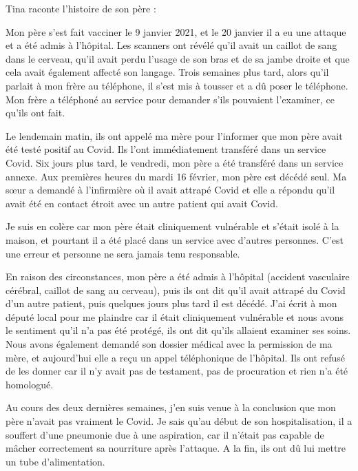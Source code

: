 Tina raconte l'histoire de son père :

Mon père s'est fait vacciner le 9 janvier 2021, et le 20 janvier il a eu une
attaque et a été admis à l'hôpital. Les scanners ont révélé qu'il avait un
caillot de sang dans le cerveau, qu'il avait perdu l'usage de son bras et de sa
jambe droite et que cela avait également affecté son langage. Trois semaines
plus tard, alors qu'il parlait à mon frère au téléphone, il s'est mis à tousser
et a dû poser le téléphone. Mon frère a téléphoné au service pour demander s'ils
pouvaient l'examiner, ce qu'ils ont fait.

Le lendemain matin, ils ont appelé ma mère pour l'informer que mon père avait
été testé positif au Covid. Ils l'ont immédiatement transféré dans un service
Covid. Six jours plus tard, le vendredi, mon père a été transféré dans un
service annexe. Aux premières heures du mardi 16 février, mon père est décédé
seul. Ma sœur a demandé à l'infirmière où il avait attrapé Covid et elle a
répondu qu'il avait été en contact étroit avec un autre patient qui avait Covid.

Je suis en colère car mon père était cliniquement vulnérable et s'était isolé à
la maison, et pourtant il a été placé dans un service avec d'autres
personnes. C'est une erreur et personne ne sera jamais tenu responsable.

En raison des circonstances, mon père a été admis à l'hôpital (accident
vasculaire cérébral, caillot de sang au cerveau), puis ils ont dit qu'il avait
attrapé du Covid d'un autre patient, puis quelques jours plus tard il est
décédé. J'ai écrit à mon député local pour me plaindre car il était cliniquement
vulnérable et nous avons le sentiment qu'il n'a pas été protégé, ils ont dit
qu'ils allaient examiner ses soins. Nous avons également demandé son dossier
médical avec la permission de ma mère, et aujourd'hui elle a reçu un appel
téléphonique de l'hôpital. Ils ont refusé de les donner car il n'y avait pas de
testament, pas de procuration et rien n'a été homologué.

Au cours des deux dernières semaines, j'en suis venue à la conclusion que mon
père n'avait pas vraiment le Covid. Je sais qu'au début de son hospitalisation,
il a souffert d'une pneumonie due à une aspiration, car il n'était pas capable
de mâcher correctement sa nourriture après l'attaque. A la fin, ils ont dû lui
mettre un tube d'alimentation.

